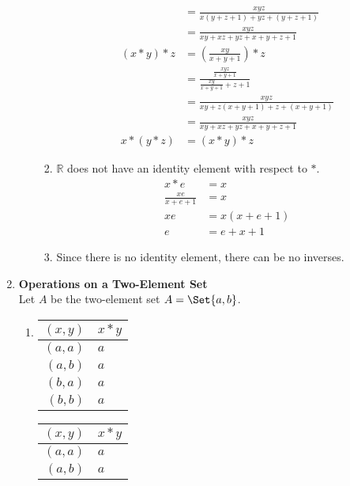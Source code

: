 \begin{enumerate}[label={\Alph*.},font={\bfseries}]
\begin{enumerate}[label={\arabic*},font={\bfseries}]
\begin{enumerate}[label={(\roman*)}]
\begin{align*}
        &= \frac{xyz}{x(y+z+1)+yz+(y+z+1)} \\
        &= \frac{xyz}{xy+xz+yz+x+y+z+1} \\
        (x*y)*z &= \left(\frac{xy}{x+y+1}\right)*z \\
        &= \frac{\frac{xyz}{x+y+1}}{\frac{xy}{x+y+1}+z+1} \\
        &= \frac{xyz}{xy+z(x+y+1)+z+(x+y+1)} \\
        &= \frac{xyz}{xy+xz+yz+x+y+z+1} \\
        x*(y*z) &= (x*y)*z
      \end{align*}
    \item $\mathbb{R}$ does not have an identity element with respect to $*$.
      \begin{align*}
        x*e &= x \\
        \frac{xe}{x+e+1} &= x \\
        xe &= x(x+e+1) \\
        e &= e+x+1
      \end{align*}
    \item Since there is no identity element, there can be no inverses.
    \end{enumerate}
  \end{enumerate}
\item {\bf Operations on a Two-Element Set} \\
  Let $A$ be the two-element set $A=\Set{a,b}$.
  \begin{enumerate}[label={\arabic*},font={\bfseries}]
  \item
    \begin{minipage}[h]{.25\textwidth}
      \begin{tabular}{ r | l }
        $(x,y)$ & $x*y$ \\
        \hline
        $(a,a)$ & $a$ \\
        $(a,b)$ & $a$ \\
        $(b,a)$ & $a$ \\
        $(b,b)$ & $a$
      \end{tabular}
    \end{minipage}
    \begin{minipage}[h]{.25\textwidth}
      \begin{tabular}{ r | l }
        $(x,y)$ & $x*y$ \\
        \hline
        $(a,a)$ & $a$ \\
        $(a,b)$ & $a$ \\

\end{tabular}
\end{minipage}
\end{enumerate}
\end{enumerate}
